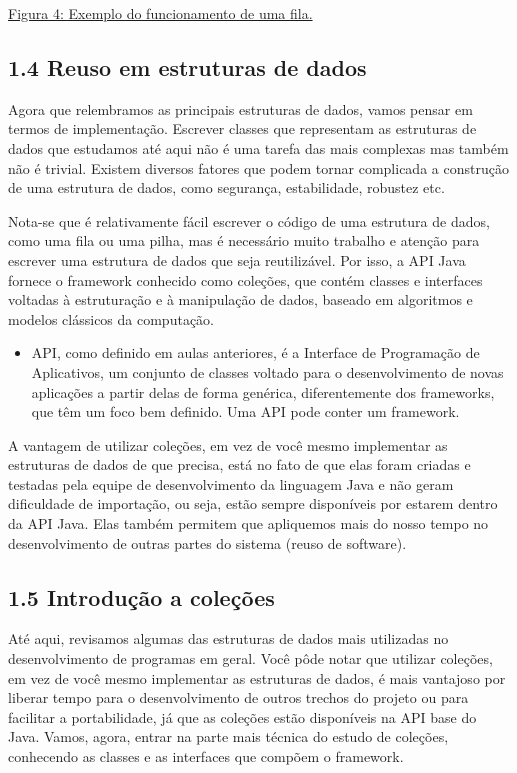 \documentclass[11pt]{article}
\begin{document}
\href{figura4.png}{Figura 4: Exemplo do funcionamento de uma fila.}

\subsection{1.4 Reuso em estruturas de dados}
\label{sec:org7b74eed}
Agora que relembramos as principais estruturas de dados, vamos pensar em termos de implementação. Escrever classes que representam as estruturas de dados que estudamos até aqui não é uma tarefa das mais complexas mas também não é trivial. Existem diversos fatores que podem tornar complicada a construção de uma estrutura de dados, como segurança, estabilidade, robustez etc.

Nota-se que é relativamente fácil escrever o código de uma estrutura de dados, como uma fila ou uma pilha, mas é necessário muito trabalho e atenção para escrever uma estrutura de dados que seja reutilizável. Por isso, a API Java fornece o framework conhecido como coleções, que contém classes e interfaces voltadas à estruturação e à manipulação de dados, baseado em algoritmos e modelos clássicos da computação.

\begin{itemize}
\item API, como definido em aulas anteriores, é a Interface de Programação de Aplicativos, um conjunto de classes voltado para o desenvolvimento de novas aplicações a partir delas de forma genérica, diferentemente dos frameworks, que têm um foco bem definido. Uma API pode conter um framework.
\end{itemize}

A vantagem de utilizar coleções, em vez de você mesmo implementar as estruturas de dados de que precisa, está no fato de que elas foram criadas e testadas pela equipe de desenvolvimento da linguagem Java e não geram dificuldade de importação, ou seja, estão sempre disponíveis por estarem dentro da API Java. Elas também permitem que apliquemos mais do nosso tempo no desenvolvimento de outras partes do sistema (reuso de software).

\subsection{1.5 Introdução a coleções}
\label{sec:orgbb2b2aa}
Até aqui, revisamos algumas das estruturas de dados mais utilizadas no desenvolvimento de programas em geral. Você pôde notar que utilizar coleções, em vez de você mesmo implementar as estruturas de dados, é mais vantajoso por liberar tempo para o desenvolvimento de outros trechos do projeto ou para facilitar a portabilidade, já que as coleções estão disponíveis na API base do Java. Vamos, agora, entrar na parte mais técnica do estudo de coleções, conhecendo as classes e as interfaces que compõem o framework.
\end{document}
